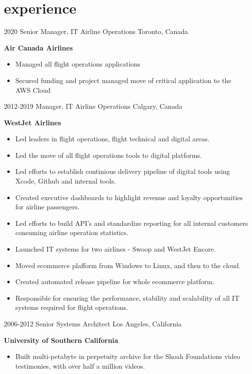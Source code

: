 \section{experience}

\begin{entrylist}
  \entry
    {2020}
    {Senior Manager, IT Airline Operations}
    {Toronto, Canada}
    {
      \textbf{Air Canada Airlines}
      \begin{itemize}
        \item Managed all flight operations applications 
	\item Secured funding and project managed move of critical application to the AWS Cloud 
      \end{itemize}
    }
  \entry
    {2012-2019}
    {Manager, IT Airline Operations}
    {Calgary, Canada}
    {
      \textbf{WestJet Airlines}
      \begin{itemize}
        \item Led leaders in flight operations, flight technical and digital areas. 
        \item Led the move of all flight operations tools to digital platforms.
        \item Led efforts to establish continious delivery pipeline of digital tools using Xcode, Github and internal tools. 
        \item Created executive dashboards to highlight revenue and loyalty opportunities for airline passengers.  
        \item Led efforts to build API's and standardize reporting for all internal customers consuming airline operation statistics. 
        \item Launched IT systems for two airlines - Swoop and WestJet Encore.
        \item Moved ecommerce plafform from Windows to Linux, and then to the cloud.
        \item Created automated release pipeline for whole ecommerce platform. 
        \item Responsible for ensuring the performance, stability and scalability of all IT systems required for flight operations. 
      \end{itemize}
    }
  \entry
    {2006-2012}
    {Senior Systems Architect}
    {Los Angeles, California}
    {
      \textbf{University of Southern California}
      \begin{itemize}
        \item Built multi-petabyte in perpetuity archive for the Shoah Foundations video testimonies, with  over half a million videos. 

\end{itemize}}
\end{entrylist}
